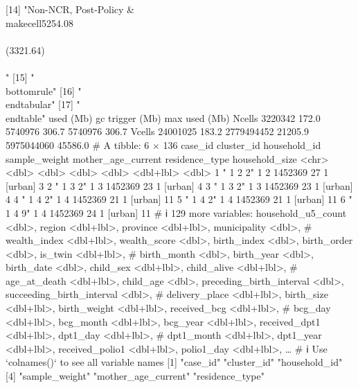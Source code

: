 [14] "Non-NCR, Post-Policy & \\makecell{5254.08 \\\\ (3321.64)}\\\\"  
[15] "\\bottomrule"                                                   
[16] "\\end{tabular}"                                                 
[17] "\\end{table}"                                                   
           used  (Mb) gc trigger    (Mb)   max used    (Mb)
Ncells  3220342 172.0    5740976   306.7    5740976   306.7
Vcells 24001025 183.2 2779494452 21205.9 5975044060 45586.0
# A tibble: 6 × 136
  case_id           cluster_id household_id sample_weight mother_age_current residence_type household_size
  <chr>                  <dbl>        <dbl>         <dbl>              <dbl> <dbl+lbl>               <dbl>
1 "       1   2  2"          1            2       1452369                 27 1 [urban]                   3
2 "       1   3  2"          1            3       1452369                 23 1 [urban]                   4
3 "       1   3  2"          1            3       1452369                 23 1 [urban]                   4
4 "       1   4  2"          1            4       1452369                 21 1 [urban]                  11
5 "       1   4  2"          1            4       1452369                 21 1 [urban]                  11
6 "       1   4  9"          1            4       1452369                 24 1 [urban]                  11
# ℹ 129 more variables: household_u5_count <dbl>, region <dbl+lbl>, province <dbl+lbl>, municipality <dbl>,
#   wealth_index <dbl+lbl>, wealth_score <dbl>, birth_index <dbl>, birth_order <dbl>, is_twin <dbl+lbl>,
#   birth_month <dbl>, birth_year <dbl>, birth_date <dbl>, child_sex <dbl+lbl>, child_alive <dbl+lbl>,
#   age_at_death <dbl+lbl>, child_age <dbl>, preceding_birth_interval <dbl>, succeeding_birth_interval <dbl>,
#   delivery_place <dbl+lbl>, birth_size <dbl+lbl>, birth_weight <dbl+lbl>, received_bcg <dbl+lbl>,
#   bcg_day <dbl+lbl>, bcg_month <dbl+lbl>, bcg_year <dbl+lbl>, received_dpt1 <dbl+lbl>, dpt1_day <dbl+lbl>,
#   dpt1_month <dbl+lbl>, dpt1_year <dbl+lbl>, received_polio1 <dbl+lbl>, polio1_day <dbl+lbl>, …
# ℹ Use `colnames()` to see all variable names
  [1] "case_id"                   "cluster_id"                "household_id"             
  [4] "sample_weight"             "mother_age_current"        "residence_type"           
